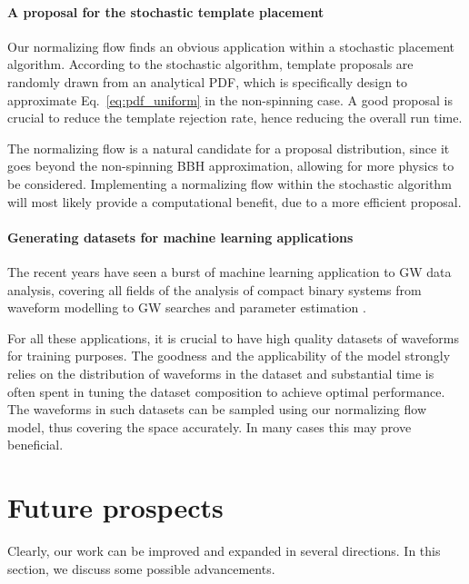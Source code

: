 \documentclass[twocolumn,showpacs,preprintnumbers,nofootinbib,prd,
superscriptaddress,10pt]{revtex4-2}
\begin{document}
\paragraph{A proposal for the stochastic template placement}

Our normalizing flow finds an obvious application within a stochastic placement algorithm. According to the stochastic algorithm, template proposals are randomly drawn from an analytical PDF, which is specifically design to approximate Eq.~\eqref{eq:pdf_uniform} in the non-spinning case.
A good proposal is crucial to reduce the template rejection rate, hence reducing the overall run time.

The normalizing flow is a natural candidate for a proposal distribution, since it goes beyond the non-spinning BBH approximation, allowing for more physics to be considered. Implementing a normalizing flow within the stochastic algorithm will most likely provide a computational benefit, due to a more efficient proposal.

\paragraph{Generating datasets for machine learning applications}

The recent years have seen a burst of machine learning application to GW data analysis, covering all fields of the analysis of compact binary systems from waveform modelling \cite{Khan:2020fso, Schmidt:2020yuu, Thomas:2022rmc, Tissino:2022thn} to GW searches \cite{Gebhard:2019ldz, Schafer:2020kor, Schafer:2021fea, Baltus:2021nme} and parameter estimation \cite{Green:2020hst, Alvares:2020bjg, Williams:2021qyt, Langendorff:2022fzq, Williams:2023ppp}.

For all these applications, it is crucial to have high quality datasets of waveforms for training purposes.
The goodness and the applicability of the model strongly relies on the distribution of waveforms in the dataset and substantial time is often spent in tuning the dataset composition to achieve optimal performance.
The waveforms in such datasets can be sampled using our normalizing flow model, thus covering the space accurately. In many cases this may prove beneficial.

\section{Future prospects} \label{sec:improvements}

Clearly, our work can be improved and expanded in several directions. In this section, we discuss some possible advancements.
\end{document}

